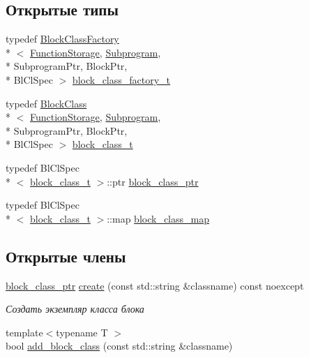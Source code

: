 \subsection*{Открытые типы}
\begin{DoxyCompactItemize}
\item 
typedef \hyperlink{classLIBKMS__namespace_1_1BlockClassFactory}{Block\-Class\-Factory}\\*
$<$ \hyperlink{classLIBKMS__namespace_1_1FunctionStorage}{Function\-Storage}, \hyperlink{classLIBKMS__namespace_1_1Subprogram}{Subprogram}, \\*
Subprogram\-Ptr, Block\-Ptr, \\*
Bl\-Cl\-Spec $>$ \hyperlink{classLIBKMS__namespace_1_1BlockClassFactory_ac764a55036aeecf1279f5b43464ab9ad}{block\-\_\-class\-\_\-factory\-\_\-t}
\item 
typedef \hyperlink{classLIBKMS__namespace_1_1BlockClass}{Block\-Class}\\*
$<$ \hyperlink{classLIBKMS__namespace_1_1FunctionStorage}{Function\-Storage}, \hyperlink{classLIBKMS__namespace_1_1Subprogram}{Subprogram}, \\*
Subprogram\-Ptr, Block\-Ptr, \\*
Bl\-Cl\-Spec $>$ \hyperlink{classLIBKMS__namespace_1_1BlockClassFactory_ab6e704b98791fd6c718cfbb0fe2d2a5a}{block\-\_\-class\-\_\-t}
\item 
typedef Bl\-Cl\-Spec\\*
$<$ \hyperlink{classLIBKMS__namespace_1_1BlockClassFactory_ab6e704b98791fd6c718cfbb0fe2d2a5a}{block\-\_\-class\-\_\-t} $>$\-::ptr \hyperlink{classLIBKMS__namespace_1_1BlockClassFactory_a882880cb8a33fcc808b41e283cea2dc3}{block\-\_\-class\-\_\-ptr}
\item 
typedef Bl\-Cl\-Spec\\*
$<$ \hyperlink{classLIBKMS__namespace_1_1BlockClassFactory_ab6e704b98791fd6c718cfbb0fe2d2a5a}{block\-\_\-class\-\_\-t} $>$\-::map \hyperlink{classLIBKMS__namespace_1_1BlockClassFactory_a6c80887a7827dcc55a3508b242b906c9}{block\-\_\-class\-\_\-map}
\end{DoxyCompactItemize}
\subsection*{Открытые члены}
\begin{DoxyCompactItemize}
\item 
\hyperlink{classLIBKMS__namespace_1_1BlockClassFactory_a882880cb8a33fcc808b41e283cea2dc3}{block\-\_\-class\-\_\-ptr} \hyperlink{classLIBKMS__namespace_1_1BlockClassFactory_a51d6671829d0b5ac15c27adc604835db}{create} (const std\-::string \&classname) const noexcept
\begin{DoxyCompactList}\small\item\em Создать экземпляр класса блока \end{DoxyCompactList}\item 
{\footnotesize template$<$typename T $>$ }\\bool \hyperlink{classLIBKMS__namespace_1_1BlockClassFactory_a185c0b7f022b7dea757e663bac1a1caa}{add\-\_\-block\-\_\-class} (const std\-::string \&classname)
\end{DoxyCompactItemize}
